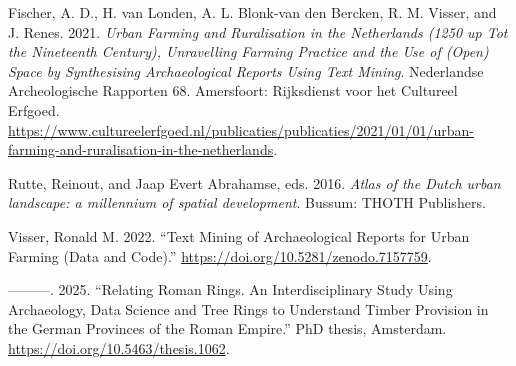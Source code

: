 \documentclass[
  letterpaper,
  DIV=11,
  numbers=noendperiod]{scrartcl}
\newlength{\cslhangindent}
\newlength{\cslentryspacingunit} %
\newenvironment{CSLReferences}[2] %
 {%
  \setlength{\parindent}{0pt}
  \ifodd #1
  \let\oldpar\par
  \def\par{\hangindent=\cslhangindent\oldpar}
  \fi
  \setlength{\parskip}{#2\cslentryspacingunit}
 }%
 {}
\begin{document}
\hypertarget{refs}{}
\begin{CSLReferences}{1}{0}
\leavevmode{}%
Fischer, A. D., H. van Londen, A. L. Blonk-van den Bercken, R. M.
Visser, and J. Renes. 2021. \emph{Urban Farming and Ruralisation in the
Netherlands (1250 up Tot the Nineteenth Century), Unravelling Farming
Practice and the Use of (Open) Space by Synthesising Archaeological
Reports Using Text Mining}. Nederlandse Archeologische Rapporten 68.
Amersfoort: Rijksdienst voor het Cultureel Erfgoed.
\url{https://www.cultureelerfgoed.nl/publicaties/publicaties/2021/01/01/urban-farming-and-ruralisation-in-the-netherlands}.

\leavevmode{}%
Rutte, Reinout, and Jaap Evert Abrahamse, eds. 2016. \emph{Atlas of the
Dutch urban landscape: a millennium of spatial development}. Bussum:
THOTH Publishers.

\leavevmode{}%
Visser, Ronald M. 2022. {``Text Mining of Archaeological Reports for
Urban Farming (Data and Code).''}
\url{https://doi.org/10.5281/zenodo.7157759}.

\leavevmode{}%
---------. 2025. {``Relating Roman Rings. An Interdisciplinary Study
Using Archaeology, Data Science and Tree Rings to Understand Timber
Provision in the German Provinces of the Roman Empire.''} PhD thesis,
Amsterdam. \url{https://doi.org/10.5463/thesis.1062}.

\end{CSLReferences}
\end{document}
